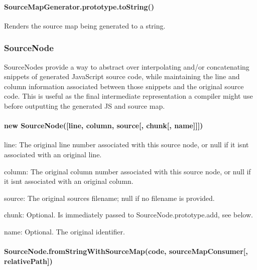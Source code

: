 \paragraph*{Source\+Map\+Generator.\+prototype.\+to\+String()}

Renders the source map being generated to a string.

\subsubsection*{Source\+Node}

Source\+Nodes provide a way to abstract over interpolating and/or concatenating snippets of generated Java\+Script source code, while maintaining the line and column information associated between those snippets and the original source code. This is useful as the final intermediate representation a compiler might use before outputting the generated J\+S and source map.

\paragraph*{new Source\+Node(\mbox{[}line, column, source\mbox{[}, chunk\mbox{[}, name\mbox{]}\mbox{]}\mbox{]})}


\begin{DoxyItemize}
\item {\ttfamily line}\+: The original line number associated with this source node, or null if it isn\textquotesingle{}t associated with an original line.
\item {\ttfamily column}\+: The original column number associated with this source node, or null if it isn\textquotesingle{}t associated with an original column.
\item {\ttfamily source}\+: The original source\textquotesingle{}s filename; null if no filename is provided.
\item {\ttfamily chunk}\+: Optional. Is immediately passed to {\ttfamily Source\+Node.\+prototype.\+add}, see below.
\item {\ttfamily name}\+: Optional. The original identifier.
\end{DoxyItemize}

\paragraph*{Source\+Node.\+from\+String\+With\+Source\+Map(code, source\+Map\+Consumer\mbox{[}, relative\+Path\mbox{]})}

